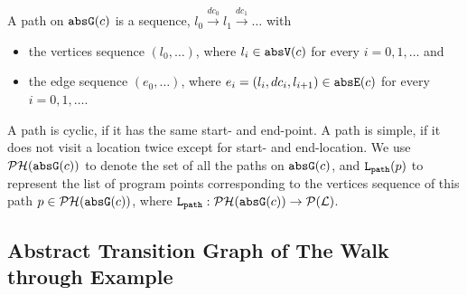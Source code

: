 \begin{defn}
  \label{def:abs_cfgpath} 
  A path on $\mathtt{abs}{\mathtt{G}}(c)$ is a sequence, $ l_0 \xrightarrow{dc_0} l_1 \xrightarrow{dc_1} \ldots $ with
  \begin{itemize}
  \item the vertices sequence $(l_0, \ldots)$, where $l_i \in \mathtt{abs}{\mathtt{V}}(c)$ for every $i = 0, 1, \ldots$ and
  \item the edge sequence $(e_0, \ldots)$, where $e_i = (l_{i}, dc_i, l_{i + 1}) \in \mathtt{abs}{\mathtt{E}}(c)$ for every $i = 0, 1, \ldots$.
  \end{itemize}
  A path is cyclic, if it has the same start- and end-point. A path is simple, if it does not visit a location twice except for start- and end-location. We use $\mathcal{PH}(\mathtt{abs}{\mathtt{G}}(c))$ to denote the set of all the paths on $\mathtt{abs}{\mathtt{G}}(c)$,
  and $\mathtt{L}_{\mathtt{path}}(p)$ to represent the list of program points corresponding to the vertices sequence of this path $p \in \mathcal{PH}(\mathtt{abs}{\mathtt{G}}(c))$,
  where $\mathtt{L}_{\mathtt{path}} : \mathcal{PH}(\mathtt{abs}{\mathtt{G}}(c)) \to \mathcal{P}{(\mathcal{L})}$.
  \end{defn}
  \subsection{Abstract Transition Graph of The Walk through Example}
  \label{sec:abs_prog_example}
  
  

